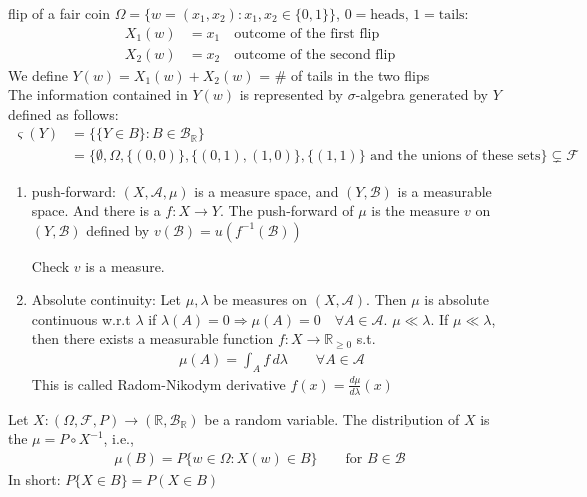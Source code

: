 \documentclass[11pt]{article}
\begin{document}
\begin{example}
    flip of a fair coin $\Omega = \{ w = (x_1,x_2): x_1,x_2 \in \{0,1\}\}$, $0 = \text{heads}, \, 1=\text{tails}$:
    \begin{align*}
        X_1(w) &= x_1  \quad \text{outcome of the first flip}\\
        X_2(w) &= x_2  \quad \text{outcome of the second flip}
    \end{align*}
    We define $Y(w) = X_1(w) + X_2(w)$ = \# of tails in the two flips \\
    The information contained in $Y(w)$ is represented by $\sigma$-algebra generated by $Y$ defined as follows:
    \begin{align*}
        \varsigma(Y) &= \{\{Y \in B\}: B \in \mathcal{B}_{\mathbb{R}}\}\\
        &= \Big\{\emptyset, \Omega, \{(0,0)\}, \{(0,1),(1,0) \} , \{(1,1)\} \text{ and the unions of these sets}\Big\} \subsetneq \mathcal{F}
    \end{align*}
\end{example}


\begin{enumerate}
    \item push-forward: $(X, \mathcal{A}, \mu)$ is a measure space, 
    and $(Y, \mathcal{B})$ is a measurable space. And there is a $f: X \to Y$.
    The push-forward of $\mu$ is the measure $v$ on $(Y, \mathcal{B})$ defined by $v(\mathcal{B}) =
    u(f^{-1}(\mathcal{B}))$
    \begin{remark}
        Check $v$ is a measure.
    \end{remark}

    \item Absolute continuity: Let $\mu, \lambda$ be measures on $(X, \mathcal{A})$. Then $\mu$ is absolute
    continuous w.r.t $\lambda$ if $\lambda(A) = 0 \Longrightarrow \mu(A) = 0 \quad \forall  A \in \mathcal{A}$.
    \remark $\mu \ll \lambda$. If $\mu \ll \lambda$, then there exists a measurable function 
    $f: X \to \mathbb{R}_{\ge 0}$ s.t. 
    \begin{align*}
        \mu(A) = \int_{A} f \, d \lambda \qquad \forall A \in \mathcal{A}
    \end{align*}
    This is called Radom-Nikodym derivative $f(x) = \frac{d \mu}{d \lambda}(x)$
\end{enumerate}

\begin{definition}
    Let $X: (\Omega, \mathcal{F}, P) \to (\mathbb{R}, \mathcal{B}_{\mathbb{R}})$ be a random variable.
    The $\underline{\text{distribution}}$ of $X$ is the $\mu = P \circ X^{-1}$, i.e.,
    \begin{align*}
        \mu (B) = P\{w \in \Omega: X(w) \in B\} \qquad \text{for } B \in \mathcal{B}
    \end{align*}
    In short: $P\{X \in B\} = P(X \in B)$
\end{definition}
\end{document}
